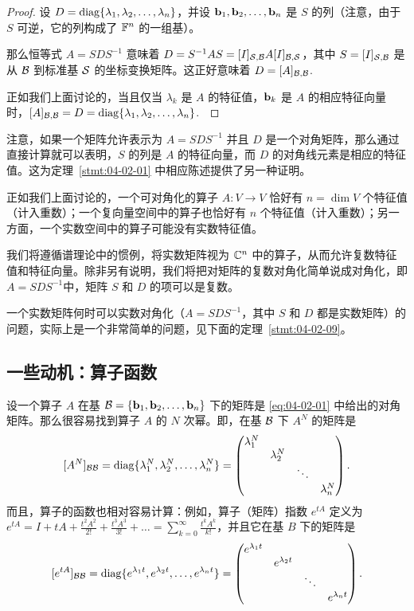\begin{proof}设 $D = \operatorname{diag}\{\lambda_1, \lambda_2, \dots, \lambda_n\}$，并设 $\mathbf{b}_1, \mathbf{b}_2, \dots, \mathbf{b}_n$ 是 $S$ 的列（注意，由于 $S$ 可逆，它的列构成了 $\mathbb{F}^n$ 的一组基）。

那么恒等式 $A = SDS^{-1}$ 意味着 $D = S^{-1}AS = [I]_{\mathcal{S},\mathcal{B}}A[I]_{\mathcal{B},\mathcal{S}}$，其中 $S = [I]_{\mathcal{S},\mathcal{B}}$ 是从 $\mathcal{B}$ 到标准基 $\mathcal{S}$ 的坐标变换矩阵。这正好意味着 $D = [A]_{\mathcal{B},\mathcal{B}}$.~

正如我们上面讨论的，当且仅当 $\lambda_k$ 是 $A$ 的特征值，$\mathbf{b}_k$ 是 $A$ 的相应特征向量时，$[A]_{\mathcal{B},\mathcal{B}} = D = \operatorname{diag}\{\lambda_1, \lambda_2, \dots, \lambda_n\}$.~\end{proof}

\begin{remark*}
注意，如果一个矩阵允许表示为 $A = SDS^{-1}$ 并且 $D$ 是一个对角矩阵，那么通过直接计算就可以表明，$S$ 的列是 $A$ 的特征向量，而 $D$ 的对角线元素是相应的特征值。这为定理~\ref{stmt:04-02-01} 中相应陈述提供了另一种证明。
\end{remark*}

正如我们上面讨论的，一个可对角化的算子 $A: V \to V$ 恰好有 $n = \dim V$ 个特征值（计入重数）；一个复向量空间中的算子也恰好有 $n$ 个特征值（计入重数）；另一方面，一个实数空间中的算子可能没有实数特征值。

我们将遵循谱理论中的惯例，将实数矩阵视为 $\mathbb{C}^n$ 中的算子，从而允许复数特征值和特征向量。除非另有说明，我们将把对矩阵的复数对角化简单说成对角化，即 $A = SDS^{-1}$中，矩阵 $S$ 和 $D$ 的项可以是复数。

一个实数矩阵何时可以实数对角化（$A = SDS^{-1}$，其中 $S$ 和 $D$ 都是实数矩阵）的问题，实际上是一个非常简单的问题，见下面的定理~\ref{stmt:04-02-09}。

\subsection{一些动机：算子函数}\label{sec:04-02-02}

设一个算子 $A$ 在基 $\mathcal{B} = \{\mathbf{b}_1, \mathbf{b}_2, \dots, \mathbf{b}_n\}$ 下的矩阵是 \eqref{eq:04-02-01} 中给出的对角矩阵。那么很容易找到算子 $A$ 的 $N$ 次幂。即，在基 $\mathcal{B}$ 下 $A^N$ 的矩阵是
$$[A^N]_{\mathcal{B}\mathcal{B}} = \operatorname{diag}\{\lambda_1^N, \lambda_2^N, \dots, \lambda_n^N\} = \begin{pmatrix} \lambda_1^N & & & \\ & \lambda_2^N & & \\ & & \ddots & \\ & & & \lambda_n^N \end{pmatrix}.$$
而且，算子的函数也相对容易计算：例如，算子（矩阵）指数 $e^{tA}$ 定义为 $e^{tA} = I + tA + \frac{t^2 A^2}{2!} + \frac{t^3 A^3}{3!} + \dots = \sum_{k=0}^\infty \frac{t^k A^k}{k!}$，并且它在基 $B$ 下的矩阵是 $$[e^{tA}]_{\mathcal{B}\mathcal{B}} = \operatorname{diag}\{e^{\lambda_1 t}, e^{\lambda_2 t}, \dots, e^{\lambda_n t}\} = \begin{pmatrix} e^{\lambda_1 t} & & & \\ & e^{\lambda_2 t} & & \\ & & \ddots & \\ & & & e^{\lambda_n t} \end{pmatrix}.$$

